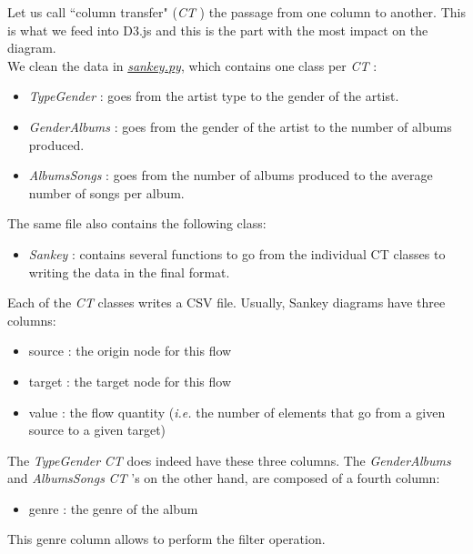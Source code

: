 \documentclass{article}
\newcommand{\ie}{\textit{i.e. }}
\newcommand{\tg}{\textit{TypeGender }}
\newcommand{\ga}{\textit{GenderAlbums }}
\newcommand{\as}{\textit{AlbumsSongs }}
\newcommand{\sk}{\textit{Sankey }}
\newcommand{\ct}{\textit{CT }}
\begin{document}
Let us call ``column transfer" (\ct) the passage from one column to another. This is what we feed into D3.js and this is the part with the most impact on the diagram. \\
We clean the data in \href{https://github.com/jorislimonier/collab-viz/blob/main/joris/src/sankey.py}{\textit{sankey.py}}, which contains one class per \ct:
\begin{itemize}
    \item \tg : goes from the artist type to the gender of the artist.
    \item \ga : goes from the gender of the artist to the number of albums produced.
    \item \as : goes from the number of albums produced to the average number of songs per album.
\end{itemize}
The same file also contains the following class:
\begin{itemize}
    \item \sk : contains several functions to go from the individual CT classes to writing the data in the final format.
\end{itemize}

Each of the \ct classes writes a CSV file. Usually, Sankey diagrams have three columns:
\begin{itemize}
    \item source : the origin node for this flow
    \item target : the target node for this flow
    \item value : the flow quantity (\ie the number of elements that go from a given source to a given target)
\end{itemize}
The \tg \ct does indeed have these three columns. The \ga and \as \ct's on the other hand, are composed of a fourth column:
\begin{itemize}
    \item genre : the genre of the album
\end{itemize}
This genre column allows to perform the filter operation.
\end{document}
